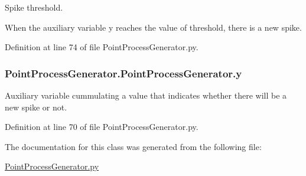 Spike threshold. 

When the auxiliary variable y reaches the value of threshold, there is a new spike. 

Definition at line 74 of file Point\+Process\+Generator.\+py.

\subsubsection[{\texorpdfstring{y}{y}}]{\setlength{\rightskip}{0pt plus 5cm}Point\+Process\+Generator.\+Point\+Process\+Generator.\+y}\hypertarget{class_point_process_generator_1_1_point_process_generator_a70a43b5c26daf20833ecbc9f4d979726}{}\label{class_point_process_generator_1_1_point_process_generator_a70a43b5c26daf20833ecbc9f4d979726}


Auxiliary variable cummulating a value that indicates whether there will be a new spike or not. 



Definition at line 70 of file Point\+Process\+Generator.\+py.



The documentation for this class was generated from the following file\+:\begin{DoxyCompactItemize}
\item 
\hyperlink{_point_process_generator_8py}{Point\+Process\+Generator.\+py}\end{DoxyCompactItemize}
